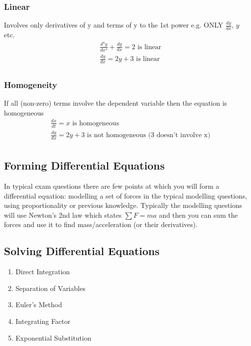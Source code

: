 \documentclass[12pt] {article}
\begin{document}
\subsubsection*{Linear}
Involves only derivatives of y and terms of y to the 1st power e.g. ONLY $\frac{dy}{dx}$, $y$ etc.
\begin{align*}
    &\frac{d^4y}{dx^4} + \frac{dy}{dx} = 2 \text{ is linear} \\
    &\frac{dy}{dx} = 2y + 3 \text{ is linear} \\
\end{align*}

\subsubsection*{Homogeneity} 
If all (non-zero) terms involve the dependent variable then the equation is homogeneous
\begin{align*}
    &\frac{dx}{dt} = x \text{ is homogeneous} \\
    &\frac{dy}{dx} = 2y + 3 \text{ is not homogeneous (3 doesn't involve x)} \\
\end{align*}

\subsection*{Forming Differential Equations}
In typical exam questions there are few points at which you will form a differential equation: modelling a set 
of forces in the typical modelling questions, using proportionality or previous knowledge. Typically the modelling 
questions will use Newton's 2nd law which states $\sum F = ma$ and then you can sum the forces and use it to find
mass/acceleration (or their derivatives). 

\subsection*{Solving Differential Equations}
\begin{enumerate} 
    \item Direct Integration
    \item Separation of Variables 
    \item Euler's Method    
    \item Integrating Factor
    \item Exponential Substitution
\end{enumerate}
\end{document}
